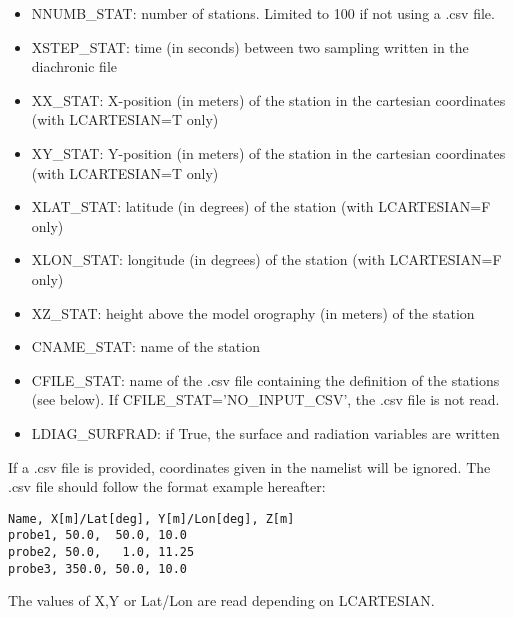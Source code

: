 \begin{itemize}
\item NNUMB\_STAT: number of stations. Limited to 100 if not using a .csv file.

\item XSTEP\_STAT: time (in seconds) between two sampling written in the diachronic file

\item XX\_STAT: X-position (in meters) of the station in the cartesian coordinates (with LCARTESIAN=T only)

\item XY\_STAT: Y-position (in meters) of the station in the cartesian coordinates (with LCARTESIAN=T only)

\item XLAT\_STAT: latitude (in degrees) of the station (with LCARTESIAN=F only)

\item XLON\_STAT: longitude (in degrees) of the station (with LCARTESIAN=F only)

\item XZ\_STAT: height above the model orography (in meters) of the station

\item CNAME\_STAT: name of the station

\item CFILE\_STAT: name of the .csv file containing the definition of the stations (see below). If CFILE\_STAT='NO\_INPUT\_CSV', the .csv file is not read.

\item LDIAG\_SURFRAD: if True, the surface and radiation variables are written

\end{itemize}

If a .csv file is provided, coordinates given in the namelist will be ignored. The .csv file should follow the format example hereafter:
\begin{verbatim}
Name, X[m]/Lat[deg], Y[m]/Lon[deg], Z[m]
probe1, 50.0,  50.0, 10.0
probe2, 50.0,   1.0, 11.25
probe3, 350.0, 50.0, 10.0
\end{verbatim}
The values of X,Y or Lat/Lon are read depending on LCARTESIAN.

